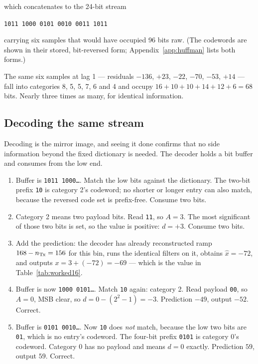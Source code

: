 \noindent
which concatenates to the 24-bit stream
\begin{center}
\texttt{1011\,1000\,0101\,0010\,0011\,1011}
\end{center}
carrying six samples that would have occupied \num{96} bits raw. (The
codewords are shown in their stored, bit-reversed form; Appendix~\ref{app:huffman}
lists both forms.)

The same six samples at lag 1 --- residuals $-136$, $+23$,
$-22$, $-70$, $-53$, $+14$ --- fall into categories 8, 5, 5, 7, 6 and 4 and
occupy $16 + 10 + 10 + 14 + 12 + 6 = \num{68}$ bits. Nearly three times as many,
for identical information.


\subsection{Decoding the same stream}
\label{sec:decodeexample}

Decoding is the mirror image, and seeing it done confirms that no side
information beyond the fixed dictionary is needed. The decoder holds a bit
buffer and consumes from the low end.

\begin{enumerate}
\item Buffer is \texttt{1011\,1000\ldots}. Match the low bits against the
dictionary. The two-bit prefix \texttt{10} is category 2's codeword; no shorter
or longer entry can also match, because the reversed code set is prefix-free.
Consume two bits.
\item Category 2 means two payload bits. Read \texttt{11}, so $A = 3$. The most
significant of those two bits is set, so the value is positive: $d = +3$.
Consume two bits.
\item Add the prediction: the decoder has already reconstructed ramp
$168 - n_{\mathrm{Tx}} = 156$ for this bin, runs the identical filters on it, obtains
$\hat{x} = -72$, and outputs $x = 3 + (-72) = -69$ --- which is the value in
Table~\ref{tab:worked16}.
\item Buffer is now \texttt{1000\,0101\ldots}. Match \texttt{10} again:
category 2. Read payload \texttt{00}, so $A = 0$, MSB clear, so
$d = 0 - (2^2 - 1) = -3$. Prediction $-49$, output $-52$. Correct.
\item Buffer is \texttt{0101\,0010\ldots}. Now \texttt{10} does \emph{not}
match, because the low two bits are \texttt{01}, which is no entry's codeword.
The four-bit prefix \texttt{0101} is category 0's codeword. Category 0 has no
payload and means $d = 0$ exactly. Prediction $59$, output $59$. Correct.
\end{enumerate}

